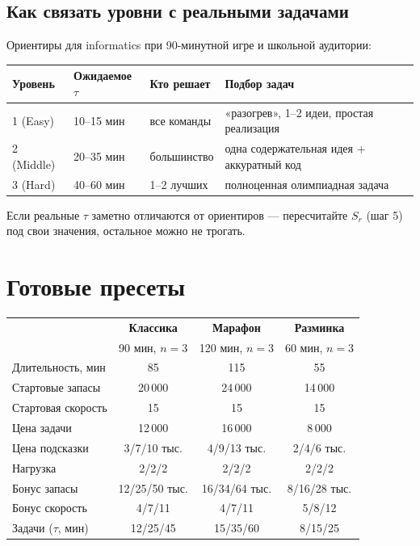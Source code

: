 \documentclass[12pt,a4paper]{article}
\begin{document}
\subsection{Как связать уровни с реальными задачами}

Ориентиры для informatics при 90-минутной игре и школьной аудитории:

\begin{center}
\begin{tabular}{llll}
\toprule
Уровень & Ожидаемое $\tau$ & Кто решает & Подбор задач \\
\midrule
1 (Easy)   & 10--15 мин & все команды      & «разогрев», 1--2 идеи, простая реализация \\
2 (Middle) & 20--35 мин & большинство      & одна содержательная идея + аккуратный код \\
3 (Hard)   & 40--60 мин & 1--2 лучших      & полноценная олимпиадная задача \\
\bottomrule
\end{tabular}
\end{center}

Если реальные $\tau$ заметно отличаются от ориентиров --- пересчитайте
$S_r$ (шаг 5) под свои значения, остальное можно не трогать.

\section{Готовые пресеты}

\newcommand{\preset}[1]{\textbf{#1}}

\begin{center}
\small
\begin{tabular}{lccc}
\toprule
 & \preset{Классика} & \preset{Марафон} & \preset{Разминка} \\
 & 90 мин, $n=3$ & 120 мин, $n=3$ & 60 мин, $n=3$ \\
\midrule
Длительность, мин   & 85       & 115      & 55 \\
Стартовые запасы    & 20\,000  & 24\,000  & 14\,000 \\
Стартовая скорость  & 15       & 15       & 15 \\
Цена задачи         & 12\,000  & 16\,000  & 8\,000 \\
Цена подсказки      & 3/7/10 тыс. & 4/9/13 тыс. & 2/4/6 тыс. \\
Нагрузка            & 2/2/2    & 2/2/2    & 2/2/2 \\
Бонус запасы        & 12/25/50 тыс. & 16/34/64 тыс. & 8/16/28 тыс. \\
Бонус скорость      & 4/7/11   & 4/7/11   & 5/8/12 \\
Задачи ($\tau$, мин) & 12/25/45 & 15/35/60 & 8/15/25 \\
\bottomrule
\end{tabular}
\end{center}
\end{document}
